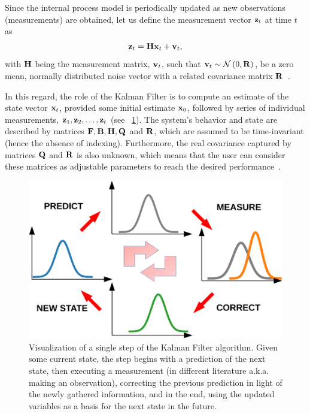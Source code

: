Since the internal process model is periodically updated as new observations (measurements) are obtained, let us define the measurement vector $\mathbf{z}_t$ at time $t$ as
\begin{equation}
    \mathbf{z}_t = \mathbf{H} \mathbf{x}_t + \mathbf{v}_t,
\end{equation}
with $\mathbf{H}$ being the measurement matrix, $\mathbf{v}_t$, such that $\mathbf{v}_{t} \sim \mathcal{N} \left( {0, \mathbf{R}} \right)$, be a zero mean, normally distributed noise vector with a related covariance matrix $\mathbf{R}$~\cite{kim2018introduction}.

In this regard, the role of the Kalman Filter is to compute an estimate of the state vector $\mathbf{x}_t$, provided some initial estimate $\mathbf{x}_0$, followed by series of individual measurements, $\mathbf{z}_1, \mathbf{z}_2, \dots, \mathbf{z}_t$ (see \figstr{}~\ref{fig:KalmanFilterDiagram}). The system's behavior and state are described by matrices $\mathbf{F}, \mathbf{B}, \mathbf{H}, \mathbf{Q}$ and $\mathbf{R}$, which are assumed to be time-invariant (hence the absence of indexing). Furthermore, the real covariance captured by matrices $\mathbf{Q}$ and $\mathbf{R}$ is also unknown, which means that the user can consider these matrices as adjustable parameters to reach the desired performance~\cite{kim2018introduction}.

\begin{figure}[t]
    \centerline{\includegraphics[width=0.7\linewidth]{figures/theoretical_foundations/kalman_filter_diagram.pdf}}
    \caption[A single iteration of the Kalman Filter]{Visualization of a single step of the Kalman Filter algorithm. Given some current state, the step begins with a prediction of the next state, then executing a measurement (in different literature a.k.a. making an observation), correcting the previous prediction in light of the newly gathered information, and in the end, using the updated variables as a basis for the next state in the future.}
    \label{fig:KalmanFilterDiagram}
\end{figure}


